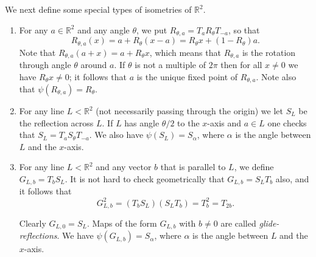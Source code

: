 \documentclass{amsart}
\newcommand{\R}         {{\mathbb{R}}}
\newcommand{\blob}      {circle(0.03cm)}
\newcommand{\al}        {\alpha}
\newcommand{\tht}       {\theta}
\renewcommand{\:}{\colon}
\theoremstyle{definition}
\begin{document}
We next define some special types of isometries of $\R^2$.
\begin{enumerate}
 \item For any $a\in\R^2$ and any angle $\theta$, we put
  $R_{\theta,a}=T_aR_\theta T_{-a}$, so that
  \[ R_{\tht,a}(x) = a + R_\tht(x-a) = R_\tht x + (1-R_\tht)a. \]
  Note that $R_{\theta,a}(a+x)=a+R_\theta x$, which means that
  $R_{\theta,a}$ is the rotation through angle $\theta$ around $a$.
  If $\theta$ is not a multiple of $2\pi$ then for all $x\neq 0$ we
  have $R_\theta x\neq 0$; it follows that $a$ is the unique fixed
  point of $R_{\theta,a}$.  Note also that $\psi(R_{\tht,a})=R_\tht$.
 \item For any line $L<\R^2$ (not necessarily passing through the
  origin) we let $S_L$ be the reflection across $L$.  If $L$ has angle
  $\theta/2$ to the $x$-axis and $a\in L$ one checks that
  $S_L=T_aS_\theta T_{-a}$.  We also have $\psi(S_L)=S_\al$, where
  $\al$ is the angle between $L$ and the $x$-axis.
 \item For any line $L<\R^2$ and any vector $b$ that is parallel to
  $L$, we define $G_{L,b}=T_bS_L$.  It is not hard to check
  geometrically that $G_{L,b}=S_LT_b$ also, and it follows that
  \[ G_{L,b}^2 = (T_b S_L)(S_L T_b) = T_b^2 = T_{2b}. \]
  \begin{center}
  \end{center}
  Clearly $G_{L,0}=S_L$.  Maps of the form $G_{L,b}$ with $b\neq 0$
  are called \emph{glide-reflections}.  We have $\psi(G_{L,b})=S_\al$,
  where $\al$ is the angle between $L$ and the $x$-axis.
\end{enumerate}
\end{document}
